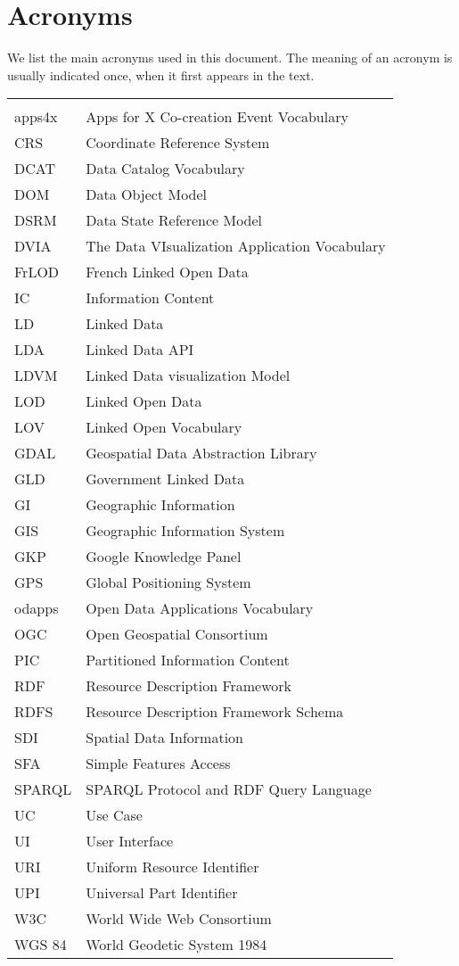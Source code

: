 \chapter*{Acronyms}
We list the main acronyms used in this document. The meaning of an acronym is usually indicated once, when it first appears in the text.

\begin{longtable}{lp{11cm}}
  &\\
  apps4x	 & Apps for X Co-creation Event Vocabulary\\
  CRS &  Coordinate Reference System\\

  DCAT & Data Catalog Vocabulary\\
  DOM  & Data Object Model \\
  DSRM & Data State Reference Model \\
  DVIA & The Data VIsualization Application Vocabulary\\

  FrLOD &  French Linked Open Data  \\

  IC & Information Content   \\
  LD  &  Linked Data\\
  LDA &  Linked Data API \\
  LDVM & Linked Data visualization Model \\
  LOD &  Linked Open Data\\

  LOV &  Linked Open Vocabulary\\

  GDAL& Geospatial Data Abstraction Library \\
  GLD &  Government Linked Data\\
  GI  &  Geographic Information\\
  GIS &  Geographic Information System\\
  GKP &  Google Knowledge Panel \\
  GPS &  Global Positioning System \\

  odapps	 & Open Data Applications Vocabulary\\
  OGC &  Open Geospatial Consortium\\

  PIC & Partitioned Information Content   \\

  RDF &  Resource Description Framework\\
  RDFS & Resource Description Framework Schema\\
  SDI  & Spatial Data Information\\
  SFA & Simple Features Access \\
  SPARQL	 & SPARQL Protocol and RDF Query Language\\

  UC & Use Case \\
  UI  & User Interface \\
  URI &	Uniform Resource Identifier\\
  UPI & Universal Part Identifier\\

  W3C & World Wide Web Consortium \\
  WGS 84 & World Geodetic System 1984 \\
\end{longtable}
